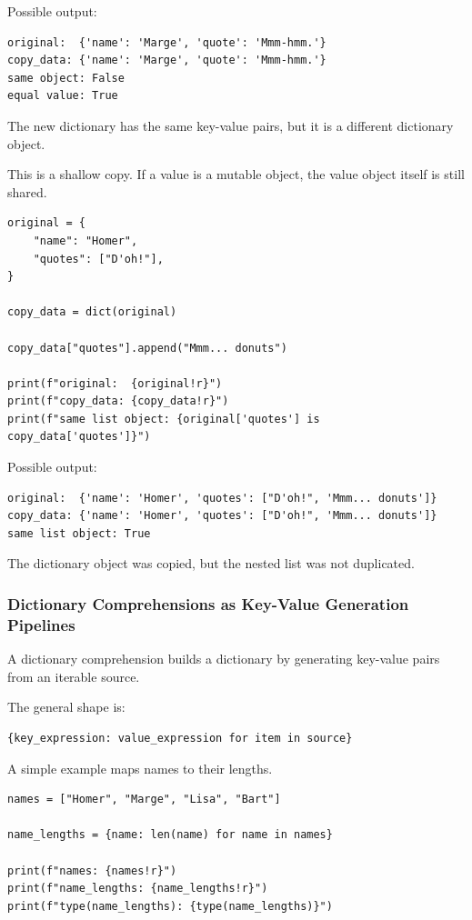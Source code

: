 Possible output:

\begin{verbatim}
original:  {'name': 'Marge', 'quote': 'Mmm-hmm.'}
copy_data: {'name': 'Marge', 'quote': 'Mmm-hmm.'}
same object: False
equal value: True
\end{verbatim}

The new dictionary has the same key-value pairs, but it is a different dictionary object.

This is a shallow copy. If a value is a mutable object, the value object itself is still shared.

\begin{verbatim}
original = {
    "name": "Homer",
    "quotes": ["D'oh!"],
}

copy_data = dict(original)

copy_data["quotes"].append("Mmm... donuts")

print(f"original:  {original!r}")
print(f"copy_data: {copy_data!r}")
print(f"same list object: {original['quotes'] is copy_data['quotes']}")
\end{verbatim}

Possible output:

\begin{verbatim}
original:  {'name': 'Homer', 'quotes': ["D'oh!", 'Mmm... donuts']}
copy_data: {'name': 'Homer', 'quotes': ["D'oh!", 'Mmm... donuts']}
same list object: True
\end{verbatim}

The dictionary object was copied, but the nested list was not duplicated.

\subsubsection{Dictionary Comprehensions as Key-Value Generation Pipelines}

A dictionary comprehension builds a dictionary by generating key-value pairs from an iterable source.

The general shape is:

\begin{verbatim}
{key_expression: value_expression for item in source}
\end{verbatim}

A simple example maps names to their lengths.

\begin{verbatim}
names = ["Homer", "Marge", "Lisa", "Bart"]

name_lengths = {name: len(name) for name in names}

print(f"names: {names!r}")
print(f"name_lengths: {name_lengths!r}")
print(f"type(name_lengths): {type(name_lengths)}")
\end{verbatim}

